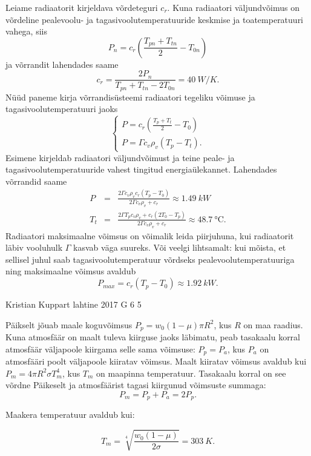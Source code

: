 \documentclass[11pt, twoside]{article}
\begin{document}
{{\ifSolution
Leiame radiaatorit kirjeldava võrdeteguri $c_{r}$. Kuna radiaatori
väljundvõimus on võrdeline pealevoolu- ja tagasivoolutemperatuuride
keskmise ja toatemperatuuri vahega, siis
\[
P_{n}=c_{r}\left(\frac{T_{pn}+T_{tn}}{2}-T_{0n}\right)
\]
\noindent ja võrrandit lahendades saame
\[
c_{r}=\frac{2P_{n}}{T_{pn}+T_{tn}-2T_{0n}}=\SI{40}{W/K}.
\]
Nüüd paneme kirja võrrandisüsteemi radiaatori tegeliku võimuse ja
tagasivoolutemperatuuri jaoks
\[
\left\{ \begin{array}{c}
P=c_{r}\left(\frac{T_{p}+T_{t}}{2}-T_{0}\right)\\
P=\Gamma c_{v}\rho_{v}\left(T_{p}-T_{t}\right).
\end{array}\right.
\]
Esimene kirjeldab radiaatori väljundvõimust ja teine peale- ja tagasivoolutemperatuuride
vahest tingitud energiaülekannet. Lahendades võrrandid saame 
\begin{eqnarray*}
P & = & \frac{2\Gamma c_{v}\rho_{v}c_{r}\left(T_{p}-T_{0}\right)}{2\Gamma c_{v}\rho_{v}+c_{r}}\approx\SI{1.49}{kW}\\
T_{t} & = & \frac{2\Gamma T_{p}c_{v}\rho_{v}+c_{r}\left(2T_{0}-T_{p}\right)}{2\Gamma c_{v}\rho_{v}+c_{r}}\approx\SI{48.7}{\celsius}.
\end{eqnarray*}
Radiaatori maksimaalne võimsus on võimalik leida piirjuhuna, kui radiaatorit
läbiv vooluhulk $\Gamma$ kasvab väga suureks. Või veelgi lihtsamalt:
kui mõista, et sellisel juhul saab tagasivoolutemperatuur võrdseks
pealevoolutemperatuuriga ning maksimaalne võimsus avaldub
\[
P_{max}=c_{r}\left(T_{p}-T_{0}\right)\approx\SI{1.92}{kW}.
\]
\fi
}

{Kristian Kuppart} %
{lahtine} %
{2017} %
{G 6} %
{5} %
{

\ifSolution
Päikselt jõuab maale koguvõimsus $P_p=w_0 \left(1-\mu\right)\pi R^2$, kus $R$ on maa raadius. Kuna atmosfäär on maalt tuleva kiirguse jaoks läbimatu, peab tasakaalu korral atmosfäär väljapoole kiirgama selle sama võimsuse: $P_p=P_a$, kus $P_a$ on atmosfääri poolt väljapoole kiiratav võimsus. Maalt kiiratav võimsus avaldub kui $P_m=4 \pi R^2 \sigma T_m^4$, kus $T_m$ on maapinna temperatuur. Tasakaalu korral on see võrdne Päikeselt ja atmosfäärist tagasi kiirgunud võimsuste summaga:
\[P_m=P_p+P_a=2P_p.\]

Maakera temperatuur avaldub kui:

\[T_m=\sqrt[4]{\frac{w_0\left(1-\mu\right)}{2\sigma}}=\SI{303}{K}.\]
\fi
}

}
\end{document}
